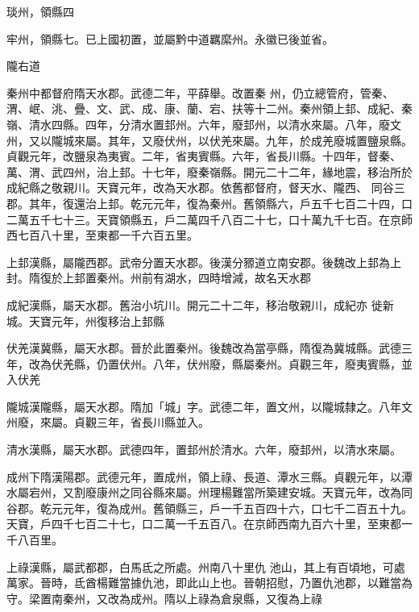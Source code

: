 \begin{pinyinscope}
 琰州，領縣四



 牢州，領縣七。已上國初置，並屬黔中道羈縻州。永徽已後並省。



 隴右道



 秦州中都督府隋天水郡。武德二年，平薛舉。改置秦
 州，仍立總管府，管秦、渭、岷、洮、疊、文、武、成、康、蘭、宕、扶等十二州。秦州領上邽、成紀、秦嶺、清水四縣。四年，分清水置邽州。六年，廢邽州，以清水來屬。八年，廢文州，又以隴城來屬。其年，又廢伏州，以伏羌來屬。九年，於成羌廢城置鹽泉縣。貞觀元年，改鹽泉為夷賓。二年，省夷賓縣。六年，省長川縣。十四年，督秦、萬、渭、武四州，治上邽。十七年，廢秦嶺縣。開元二十二年，緣地震，移治所於成紀縣之敬親川。天寶元年，改為天水郡。依舊都督府，督天水、隴西、
 同谷三郡。其年，復還治上邽。乾元元年，復為秦州。舊領縣六，戶五千七百二十四，口二萬五千七十三。天寶領縣五，戶二萬四千八百二十七，口十萬九千七百。在京師西七百八十里，至東都一千六百五里。



 上邽漢縣，屬隴西郡。武帝分置天水郡。後漢分豲道立南安郡。後魏改上邽為上封。隋復於上邽置秦州。州前有湖水，四時增減，故名天水郡



 成紀漢縣，屬天水郡。舊治小坑川。開元二十二年，移治敬親川，成紀亦
 徙新城。天寶元年，州復移治上邽縣



 伏羌漢冀縣，屬天水郡。晉於此置秦州。後魏改為當亭縣，隋復為冀城縣。武德三年，改為伏羌縣，仍置伏州。八年，伏州廢，縣屬秦州。貞觀三年，廢夷賓縣，並入伏羌



 隴城漢隴縣，屬天水郡。隋加「城」字。武德二年，置文州，以隴城隸之。八年文州廢，來屬。貞觀三年，省長川縣並入。



 清水漢縣，屬天水郡。武德四年，置邽州於清水。六年，廢邽州，以清水來屬。



 成州下隋漢陽郡。武德元年，置成州，領上祿、長道、潭水三縣。貞觀元年，以潭水屬宕州，又割廢康州之同谷縣來屬。州理楊難當所築建安城。天寶元年，改為同谷郡。乾元元年，復為成州。舊領縣三，戶一千五百四十六，口七千二百五十九。天寶，戶四千七百二十七，口二萬一千五百八。在京師西南九百六十里，至東都一千八百里。



 上祿漢縣，屬武都郡，白馬氐之所處。州南八十里仇
 池山，其上有百頃地，可處萬家。晉時，氐酋楊難當據仇池，即此山上也。晉朝招慰，乃置仇池郡，以難當為守。梁置南秦州，又改為成州。隋以上祿為倉泉縣，又復為上祿




\end{pinyinscope}
